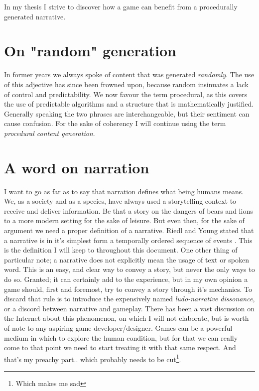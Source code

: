 In my thesis I strive to discover how a \rogue game can benefit from a procedurally generated narrative.

\section{On "random" generation}
In former years we always spoke of content that was generated \emph{randomly}. The use of this adjective has since been frowned upon, because random insinuates a lack of control and predictability. We now favour the term procedural, as this covers the use of predictable algorithms and a structure that is mathematically justified. Generally speaking the two phrases are interchangeable, but their sentiment can cause confusion. For the sake of coherency I will continue using the term \textit{procedural content generation}.
\section{A word on narration}
I want to go as far as to say that narration defines what being humans means. We, as a society and as a species, have always used a storytelling context to receive and deliver information. Be that a story on the dangers of bears and lions to a more modern setting for the sake of leisure. But even then, for the sake of argument we need a proper definition of a narrative. Riedl and Young stated that a narrative is in it's simplest form a temporally ordered sequence of events \citep{Riedl:2004:IPM:1018409.1018753}. This is the definition I will keep to throughout this document. One other thing of particular note; a narrative does not explicitly mean the usage of text or spoken word. This is an easy, and clear way to convey a story, but never the only ways to do so. Granted; it can certainly add to the experience, but in my own opinion a game should, first and foremost, try to convey a story through it's mechanics. To discard that rule is to introduce the expensively named \textit{ludo-narrative dissonance}, or a discord between narrative and gameplay. There has been a vast discussion on the Internet about this phenomenon, on which I will not elaborate, but is worth of note to any aspiring game developer/designer. Games can be a powerful medium in which to explore the human condition, but for that we can really come to that point we need to start treating it with that same respect. And that's my preachy part.. which probably needs to be cut\footnote{Which makes me sad}.
